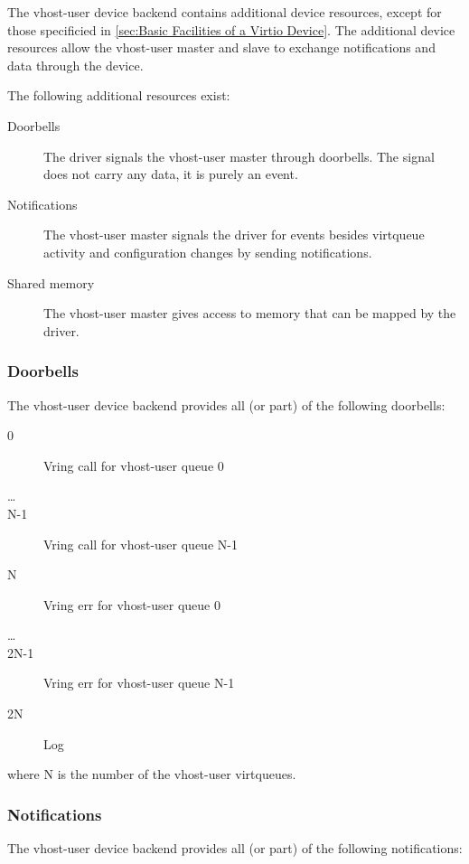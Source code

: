 The vhost-user device backend contains additional device resources, except for
those specificied in \ref{sec:Basic Facilities of a Virtio Device}. The
additional device resources allow the vhost-user master and slave to exchange
notifications and data through the device.

The following additional resources exist:
\begin{description}
  \item[Doorbells] The driver signals the vhost-user master through doorbells.  The signal does not carry any data, it is purely an event.
  \item[Notifications] The vhost-user master signals the driver for events besides virtqueue activity and configuration changes by sending notifications.
  \item[Shared memory] The vhost-user master gives access to memory that can be mapped by the driver.
\end{description}

\subsubsection{Doorbells}\label{sec:Device Types / Vhost-user Device Backend / Additional Device Resources / Doorbells}

The vhost-user device backend provides all (or part) of the following doorbells:

\begin{description}
\item[0] Vring call for vhost-user queue 0
\item[\ldots]
\item[N-1] Vring call for vhost-user queue N-1
\item[N] Vring err for vhost-user queue 0
\item[\ldots]
\item[2N-1] Vring err for vhost-user queue N-1
\item[2N] Log
\end{description}

where N is the number of the vhost-user virtqueues.

\subsubsection{Notifications}\label{sec:Device Types / Vhost-user Device Backend / Additional Device Resources / Notifications}

The vhost-user device backend provides all (or part) of the following
notifications:


